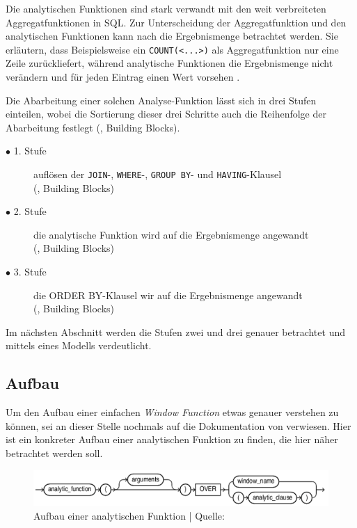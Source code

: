 Die analytischen Funktionen sind stark verwandt mit den weit verbreiteten Aggregatfunktionen
in SQL. Zur Unterscheidung der Aggregatfunktion und den analytischen Funktionen
kann nach \citet{Nuijten2023} die Ergebnismenge betrachtet werden. Sie erläutern,
dass Beispielsweise ein \texttt{COUNT(<...>)} als Aggregatfunktion nur eine
Zeile zurückliefert, während analytische Funktionen die Ergebnismenge nicht verändern
und für jeden Eintrag einen Wert vorsehen \citep{Nuijten2023}.

Die Abarbeitung einer solchen Analyse-Funktion lässt sich in drei Stufen
einteilen, wobei die Sortierung dieser drei Schritte auch die Reihenfolge der Abarbeitung
festlegt (\cite{Nuijten2023}, Building Blocks).
\begin{description}
	\item[$\bullet$ 1. Stufe] auflösen der \texttt{JOIN}-, \texttt{WHERE}-, \texttt{GROUP
		BY}- und \texttt{HAVING}-Klausel \\ (\cite{Nuijten2023}, Building Blocks)

	\item[$\bullet$ 2. Stufe] die analytische Funktion wird auf die Ergebnismenge angewandt
		\\ (\cite{Nuijten2023}, Building Blocks)

	\item[$\bullet$ 3. Stufe] die ORDER BY-Klausel wir auf die Ergebnismenge angewandt
		\\ (\cite{Nuijten2023}, Building Blocks)
\end{description}
Im nächsten Abschnitt werden die Stufen zwei und drei genauer betrachtet und mittels
eines Modells verdeutlicht.

\subsection{Aufbau}
\label{sec:aufbau} Um den Aufbau einer einfachen \textit{Window Function} etwas
genauer verstehen zu können, sei an dieser Stelle nochmals auf die Dokumentation
von \citet{oracle} verwiesen. Hier ist ein konkreter Aufbau einer analytischen Funktion
zu finden, die hier näher betrachtet werden soll.

\begin{figure}[h]
	\centering
	\includegraphics[scale=0.5]{img/aufbauAnalyticFunction.jpg}
	\caption{ Aufbau einer analytischen Funktion | Quelle: \citep{oracle}}
	\label{fig:aufbauAnalyticFunction}
\end{figure}

